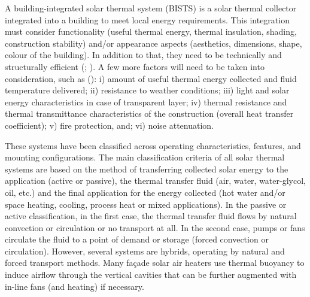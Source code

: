 
A building-integrated solar thermal system (BISTS) is a solar thermal collector integrated into a building to meet local energy requirements. This integration must consider functionality (useful thermal energy, thermal insulation, shading, construction stability) and/or appearance aspects (aesthetics, dimensions, shape, colour of the building). In addition to that, they need to be technically and structurally efficient (\cite{Wall2012}; \cite{Buker2015}). A few more factors will need to be taken into consideration, such as (\cite{COSTOffice2015}): i) amount of useful thermal energy collected and fluid temperature delivered; ii) resistance to weather conditions; iii) light and solar energy characteristics in case of transparent layer; iv) thermal resistance and thermal transmittance characteristics of the construction (overall heat transfer coefficient); v) fire protection, and; vi) noise attenuation.
 





These systems have been classified across operating characteristics, features, and mounting configurations. The main classification criteria of all solar thermal systems are based on the method of transferring collected solar energy to the application (active or passive), the thermal transfer fluid (air, water, water-glycol, oil, etc.) and the final application for the energy collected (hot water and/or space heating, cooling, process heat or mixed applications). In the passive or active classification, in the first case, the thermal transfer fluid flows by natural convection or circulation or no transport at all. In the second case, pumps or fans circulate the fluid to a point of demand or storage (forced convection or circulation). However, several systems are hybrids, operating by natural and forced transport methods. Many fa\c{c}ade solar air heaters use thermal buoyancy to induce airflow through the vertical cavities that can be further augmented with in-line fans (and heating) if necessary.

